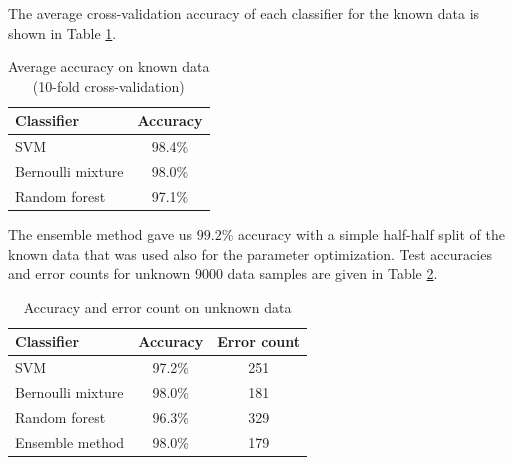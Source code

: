 The average cross-validation accuracy of each classifier for the known
data is shown in Table \ref{results1k}.

\begin{table}[!ht]
\caption{Average accuracy on known data (10-fold cross-validation)}
\label{results1k}
\begin{center}
\begin{tabular}{l|c}
Classifier & Accuracy \\ \hline
SVM & 98.4\% \\
Bernoulli mixture & 98.0\% \\
Random forest & 97.1\% \\
\end{tabular}
\end{center}
\end{table}

The ensemble method gave us $99.2 \%$ accuracy with a simple half-half
split of the known data that was used also for the parameter
optimization. Test accuracies and error counts for unknown 9000 data
samples are given in Table \ref{results9k}.

\begin{table}[!ht]
\caption{Accuracy and error count on unknown data}
\label{results9k}
\begin{center}
\begin{tabular}{l|c|c}
Classifier & Accuracy & Error count \\ \hline
SVM & 97.2\% & 251 \\
Bernoulli mixture & 98.0\% & 181 \\
Random forest & 96.3\% & 329 \\ \hline
Ensemble method & 98.0\% & 179 \\
\end{tabular}
\end{center}
\end{table}
